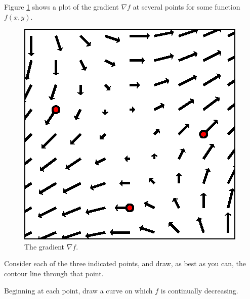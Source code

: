 \begin{activity} \label{A:10.6.12} 
  Figure \ref{F:10.6.gradient.field} shows a plot of the gradient
  $\nabla f$ at several points for some function $f(x,y)$.

  \begin{figure}[ht]
    \begin{center}
      \includegraphics{figures/fig_10_6_gradient_field.eps}
    \end{center}	
    \caption{The gradient $\nabla f$.}
    \label{F:10.6.gradient.field}
  \end{figure}

  \ba
\item Consider each of the three indicated points, and draw, as best
  as you can, the contour line through that point.

\item Beginning at each point, draw a curve on which $f$ is continually
  decreasing. 

  \ea

\end{activity}
\aftera
